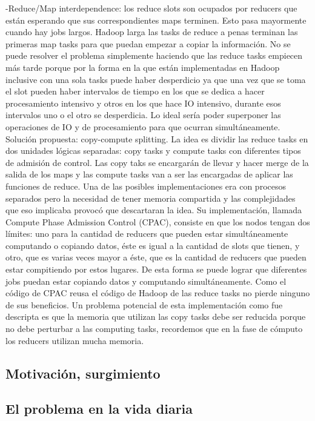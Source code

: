 -Reduce/Map interdependence: los reduce slots son ocupados por reducers que están esperando que 
sus correspondientes maps terminen. Esto pasa mayormente cuando hay jobs largos. Hadoop
larga las tasks de reduce a penas terminan las primeras map tasks para que puedan empezar a copiar
la información. No se puede resolver el problema simplemente haciendo que las reduce tasks empiecen
más tarde porque por la forma en la que están implementadas en Hadoop inclusive con una sola tasks
puede haber desperdicio ya que una vez que se toma el slot pueden haber intervalos de tiempo 
en los que se dedica a hacer procesamiento intensivo y otros en los que hace IO intensivo, durante
esos intervalos uno o el otro se desperdicia. Lo ideal sería poder superponer las operaciones de IO 
y de procesamiento para que ocurran simultáneamente.
Solución propuesta: copy-compute splitting. La idea es dividir las reduce tasks en dos unidades 
lógicas separadas: copy tasks y compute tasks con diferentes tipos de admisión de control. Las
copy taks se encargarán de llevar y hacer merge de la salida de los maps y las compute tasks
van a ser las encargadas de aplicar las funciones de reduce. Una de las posibles implementaciones
era con procesos separados pero la necesidad de tener memoria compartida y las complejidades 
que eso implicaba provocó que descartaran la idea. Su implementación, llamada Compute Phase
Admission Control (CPAC), consiste en que los nodos tengan dos límites: uno para la cantidad
de reducers que pueden estar simultáneamente computando o copiando datos, éste es igual a 
la cantidad de slots que tienen, y otro, que es varias veces mayor a éste, que es la cantidad
de reducers que pueden estar compitiendo por estos lugares. De esta forma se puede lograr 
que diferentes jobs puedan estar copiando datos y computando simultáneamente. Como el código de
CPAC reusa el código de Hadoop de las reduce tasks no pierde ninguno de sus beneficios.
Un problema potencial de esta implementación como fue descripta es que la memoria que 
utilizan las copy tasks debe ser reducida porque no debe perturbar a las computing tasks,
recordemos que en la fase de cómputo los reducers utilizan mucha memoria.

\subsection{Motivación, surgimiento}
\subsection{El problema en la vida diaria}
